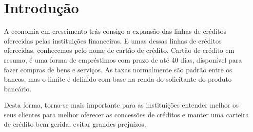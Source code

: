 \documentclass[
	12pt,				%
	openright,			%
	oneside,      %
	a4paper,			%
	english,			%
	french,				%
	spanish,			%
	brazil,				%
	]{abntex2}\usepackage[]{graphicx}\usepackage[table]{xcolor}
\theoremstyle{definition}
\begin{document}
\listoffigures*
\cleardoublepage

\listoftables*
\cleardoublepage



\tableofcontents*
\cleardoublepage

\textual

\chapter[Introdução]{Introdução}

A economia em crescimento trás consigo a expansão das linhas de créditos oferecidas pelas instituições financeiras.
E umas dessas linhas de créditos oferecidas, conhecemos pelo nome de cartão de crédito. Cartão de crédito em resumo, é uma forma de empréstimos com prazo de até 40 dias, disponível para fazer compras de bens e serviços. As taxas normalmente são padrão entre os bancos, mas o limite é definido com base na renda do solicitante do produto bancário.

Desta forma, torna-se mais importante para as instituições entender melhor os seus clientes para melhor oferecer as concessões de créditos e manter uma carteira de crédito bem gerida, evitar grandes prejuízos.
\end{document}
